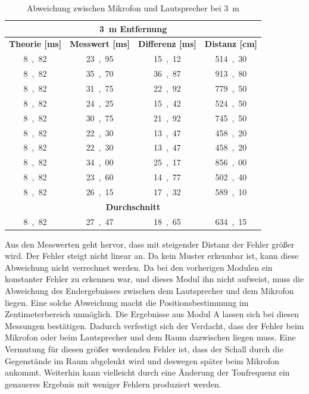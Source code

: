 \begin{table}[H]
\centering
\caption{Abweichung zwischen Mikrofon und Lautsprecher bei \SI{3}{m}}
\label{tab:modul_D_3}
\begin{tabular}{|c|c|c|c|}
\hline
\multicolumn{4}{|c|}{\textbf{\SI{3}{\m} Entfernung}}                                                                                                              \\ \hline
\textbf{Theorie [\si{ms}]} & \textbf{Messwert [\si{ms}]} & \multicolumn{1}{l|}{\textbf{Differenz [\si{ms}]}} & \multicolumn{1}{l|}{\textbf{Distanz [\si{cm}]}} \\ \hline
\si{8,82}	 & 	\si{23,95}	 & 	\si{15,12}	 & 	\si{514,30}	 \\ \hline
\si{8,82}	 & 	\si{35,70}	 & 	\si{36,87}	 & 	\si{913,80}	 \\ \hline
\si{8,82}	 & 	\si{31,75}	 & 	\si{22,92}	 & 	\si{779,50}	 \\ \hline
\si{8,82}	 & 	\si{24,25}	 & 	\si{15,42}	 & 	\si{524,50}	 \\ \hline
\si{8,82}	 & 	\si{30,75}	 & 	\si{21,92}	 & 	\si{745,50}	 \\ \hline
\si{8,82}	 & 	\si{22,30}	 & 	\si{13,47}	 & 	\si{458,20}	 \\ \hline
\si{8,82}	 & 	\si{22,30}	 & 	\si{13,47}	 & 	\si{458,20}	 \\ \hline
\si{8,82}	 & 	\si{34,00}	 & 	\si{25,17}	 & 	\si{856,00}	 \\ \hline
\si{8,82}	 & 	\si{23,60}	 & 	\si{14,77}	 & 	\si{502,40}	 \\ \hline
\si{8,82}	 & 	\si{26,15}	 & 	\si{17,32}	 & 	\si{589,10}	 \\ \hline
\multicolumn{4}{|c|}{\textbf{Durchschnitt}}                                                                                                                \\ \hline
\si{8,82}	 & 	\si{27,47}	 & 	\si{18,65}	 & 	\si{634,15}	 \\ \hline
\end{tabular}
\end{table}


Aus den Messwerten geht hervor, dass mit steigender Distanz der Fehler größer wird. Der Fehler steigt nicht linear an. Da kein Muster erkennbar ist, kann diese Abweichung nicht verrechnet werden. Da bei den vorherigen Modulen ein konstanter Fehler zu erkennen war, und dieses Modul ihn nicht aufweist, muss die Abweichung des Endergebnisses zwischen dem Lautsprecher und dem Mikrofon liegen. Eine solche Abweichung macht die Positionsbestimmung im Zentimeterbereich unmöglich. Die Ergebnisse aus Modul A lassen sich bei diesen Messungen bestätigen. Dadurch verfestigt sich der Verdacht, dass der Fehler beim Mikrofon oder beim Lautsprecher und dem Raum dazwischen liegen muss. Eine Vermutung für diesen größer werdenden Fehler ist, dass der Schall durch die Gegenstände im Raum abgelenkt wird und deswegen später beim Mikrofon ankommt. Weiterhin kann vielleicht durch eine Änderung der Tonfrequenz ein genaueres Ergebnis mit weniger Fehlern produziert werden. 

